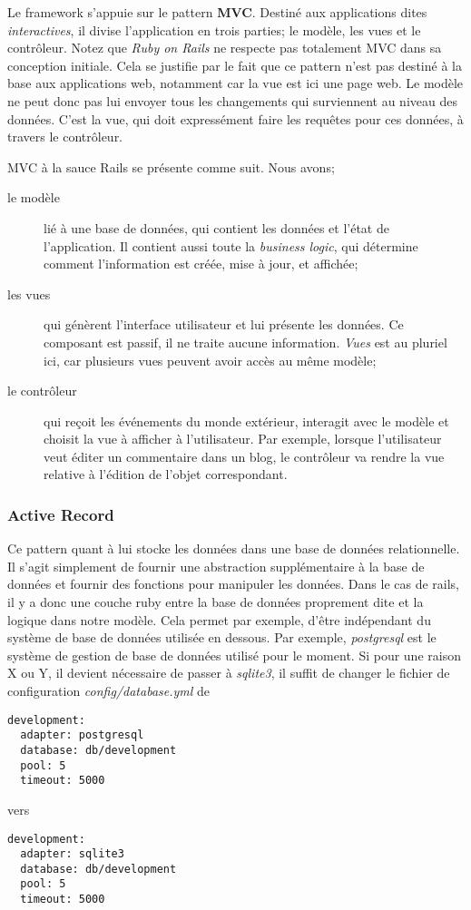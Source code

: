 Le framework s'appuie sur le pattern \textbf{MVC}. Destiné aux applications dites \textit{interactives}, il divise l'application en trois parties; le modèle, les vues et le contrôleur. Notez que \textit{Ruby on Rails} ne respecte pas totalement MVC dans sa conception initiale. Cela se justifie par le fait que ce pattern n'est pas destiné à la base aux applications web, notamment car la vue est ici une page web. Le modèle ne peut donc pas lui envoyer tous les changements qui surviennent au niveau des données. C'est la vue, qui doit expressément faire les requêtes pour ces données, à travers le contrôleur.

MVC à la sauce Rails se présente comme suit. Nous avons;

\begin{description}
\item[le modèle] lié à une base de données, qui contient les données et l'état de l'application. Il contient aussi toute la \textit{business logic}, qui détermine comment l'information est créée, mise à jour, et affichée;
\item[les vues] qui génèrent l'interface utilisateur et lui présente les données. Ce composant est passif, il ne traite aucune information. \textit{Vues} est au pluriel ici, car plusieurs vues peuvent avoir accès au même modèle;
\item[le contrôleur] qui reçoit les événements du monde extérieur, interagit avec le modèle et choisit la vue à afficher à l'utilisateur. Par exemple, lorsque l'utilisateur veut éditer un commentaire dans un blog, le contrôleur va rendre la vue relative à l'édition de l'objet correspondant. 
\end{description} 

\subsubsection{Active Record}
Ce pattern quant à lui stocke les données dans une base de données relationnelle. Il s'agit simplement de fournir une abstraction supplémentaire à la base de données et fournir des fonctions pour manipuler les données. Dans le cas de rails, il y a donc une couche ruby entre la base de données proprement dite et la logique dans notre modèle. Cela permet par exemple, d'être indépendant du système de base de données utilisée en dessous.  Par exemple, \textit{postgresql} est le système de gestion de base de données utilisé pour le moment. Si pour une raison X ou Y, il devient nécessaire de passer à \textit{sqlite3}, il suffit de changer le fichier de configuration \textit{config/database.yml} de
\begin{lstlisting}
development:
  adapter: postgresql
  database: db/development
  pool: 5
  timeout: 5000
\end{lstlisting}
vers
\begin{lstlisting}
development:
  adapter: sqlite3
  database: db/development
  pool: 5
  timeout: 5000
\end{lstlisting}

